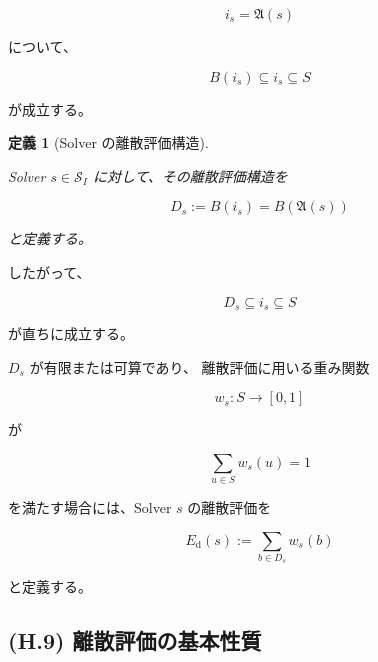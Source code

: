 \documentclass[a4paper,11pt]{article}
\newtheorem{definition}{定義}[section]
\begin{document}
\begin{equation}
    i_s=\mathfrak{A}(s)
\end{equation}

について、

\begin{equation}
    B(i_s)
    \subseteq
    i_s
    \subseteq
    S
\end{equation}

が成立する。

\begin{definition}[Solver の離散評価構造]
\label{def:H-discrete-structure}

Solver $s\in\mathcal{S}_I$ に対して、その離散評価構造を

\begin{equation}
    \boxed{
        D_s
        :=
        B(i_s)
        =
        B(\mathfrak{A}(s))
    }
    \label{eq:H-Ds}
\end{equation}

と定義する。
\end{definition}

したがって、

\begin{equation}
    \boxed{
        D_s\subseteq i_s\subseteq S
    }
    \label{eq:H-Ds-inclusion}
\end{equation}

が直ちに成立する。

$D_s$ が有限または可算であり、
離散評価に用いる重み関数

\begin{equation}
    w_s:
    S\longrightarrow[0,1]
\end{equation}

が

\begin{equation}
    \sum_{u\in S}w_s(u)=1
    \label{eq:H-weight-normalization}
\end{equation}

を満たす場合には、Solver $s$ の離散評価を

\begin{equation}
    \boxed{
        E_{\mathrm d}(s)
        :=
        \sum_{b\in D_s}w_s(b)
    }
    \label{eq:H-discrete-evaluation}
\end{equation}

と定義する。


\subsection{(H.9) 離散評価の基本性質}
\label{subsec:H9}
\end{document}
